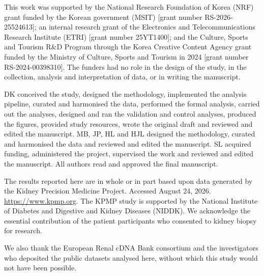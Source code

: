 \documentclass[pdflatex,sn-vancouver-num]{sn-jnl}
\theoremstyle{thmstyleone}
\theoremstyle{thmstyletwo}
\theoremstyle{thmstylethree}
\begin{document}
This work was supported by the National Research Foundation of Korea (NRF) grant funded by the Korean government (MSIT) [grant number RS-2026-25524613]; an internal research grant of the Electronics and Telecommunications Research Institute (ETRI) [grant number 25YT1400]; and the Culture, Sports and Tourism R\&D Program through the Korea Creative Content Agency grant funded by the Ministry of Culture, Sports and Tourism in 2024 [grant number RS-2024-00398310]. The funders had no role in the design of the study, in the collection, analysis and interpretation of data, or in writing the manuscript.


DK conceived the study, designed the methodology, implemented the analysis pipeline, curated and harmonised the data, performed the formal analysis, carried out the analyses, designed and ran the validation and control analyses, produced the figures, provided study resources, wrote the original draft and reviewed and edited the manuscript. MB, JP, HL and HJL designed the methodology, curated and harmonised the data and reviewed and edited the manuscript. SL acquired funding, administered the project, supervised the work and reviewed and edited the manuscript. All authors read and approved the final manuscript.


The results reported here are in whole or in part based upon data generated by the Kidney Precision Medicine Project. Accessed August 24, 2026. \url{https://www.kpmp.org}. The KPMP study is supported by the National Institute of Diabetes and Digestive and Kidney Diseases (NIDDK). We acknowledge the essential contribution of the patient participants who consented to kidney biopsy for research.

We also thank the European Renal cDNA Bank consortium and the investigators who deposited the public datasets analysed here, without which this study would not have been possible.



\end{document}
